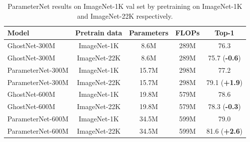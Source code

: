 \documentclass[10pt,twocolumn,letterpaper]{article}
\begin{document}
\begin{table}[htb]
	\centering
	\small
	\renewcommand\arraystretch{1.1}
	\caption{ParameterNet results on ImageNet-1K val set by pretraining on ImageNet-1K and ImageNet-22K respectively.}
	\label{tab:ghostnet}
	\setlength{\tabcolsep}{10pt}
	\begin{tabular}{l|c|ccc}
		\toprule[1.5pt]
		Model & Pretrain data  & Parameters & FLOPs & Top-1  \\
		\midrule
		GhostNet-300M~\cite{ghostnet} & ImageNet-1K &  8.6M & 289M & 76.3 \\
		GhostNet-300M~\cite{ghostnet} & ImageNet-22K &  8.6M & 289M & 75.7 (\textbf{\color{red}-0.6}) \\
		ParameterNet-300M & ImageNet-1K &  15.7M & 298M & 77.2 \\
		ParameterNet-300M & ImageNet-22K &  15.7M & 298M & 79.1 (\textbf{\color{green}+1.9}) \\
		\midrule
		GhostNet-600M~\cite{ghostnet} & ImageNet-1K &  19.8M & 579M & 78.6 \\
		GhostNet-600M~\cite{ghostnet} & ImageNet-22K &  19.8M & 579M & 78.3 (\textbf{\color{red}-0.3}) \\
		ParameterNet-600M & ImageNet-1K &  34.5M & 599M & 79.0 \\
		ParameterNet-600M & ImageNet-22K &  34.5M & 599M & 81.6 (\textbf{\color{green}+2.6}) \\
		\bottomrule[1pt]
	\end{tabular}	
\end{table}
\end{document}
